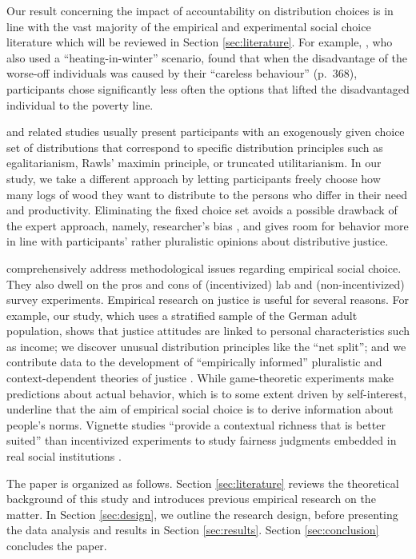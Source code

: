 \documentclass[smallcondensed]{svjour3}
\begin{document}
%
Our result concerning the impact of accountability on distribution choices is in line with the vast majority of the empirical and experimental social choice literature which will be reviewed in Section \ref{sec:literature}. For example, \citet{schwettmann_competing_2012}, who also used a ``heating-in-winter'' scenario, found that when the disadvantage of the worse-off individuals was caused by their ``careless behaviour'' (p.~368), participants chose significantly less often the options that lifted the disadvantaged individual to the poverty line.\par
%
\citet{schwettmann_competing_2012} and related studies usually present participants with an exogenously given choice set of distributions that correspond to specific distribution principles such as egalitarianism, Rawls' maximin principle, or truncated utilitarianism. In our study, we take a different approach by letting participants freely choose how many logs of wood they want to distribute to the persons who differ in their need and productivity. Eliminating the fixed choice set avoids a possible drawback of the expert approach, namely, researcher's bias \citep{ahlert_thresholds_2012}, and gives room for behavior more in line with participants' rather pluralistic opinions about distributive justice.\par
%
\citet{gaertner_empirical_2012} comprehensively address methodological issues regarding empirical social choice. They also dwell on the pros and cons of (incentivized) lab and (non-incentivized) survey experiments. Empirical research on justice is useful for several reasons. For example, our study, which uses a stratified sample of the German adult population, shows that justice attitudes are linked to personal characteristics such as income; we discover unusual distribution principles like the ``net split''; and we contribute data to the development of ``empirically informed'' pluralistic and context-dependent theories of justice \citep{konow_economics_2016}. While game-theoretic experiments make predictions about actual behavior, which is to some extent driven by self-interest, \citet{gaertner_empirical_2012} underline that the aim of empirical social choice is to derive information about people's norms. Vignette studies ``provide a contextual richness that is better suited'' than incentivized experiments to study fairness judgments embedded in real social institutions \citep[p. 109]{konow_is_2009}.\par
%
The paper is organized as follows. Section \ref{sec:literature} reviews the theoretical background of this study and introduces previous empirical research on the matter. In Section \ref{sec:design}, we outline the research design, before presenting the data analysis and results in Section \ref{sec:results}. Section \ref{sec:conclusion} concludes the paper.\par
%
\end{document}
